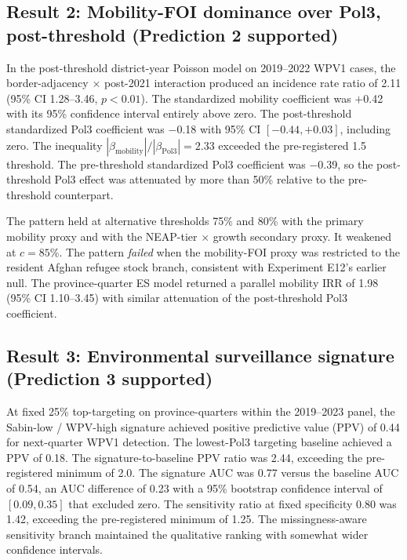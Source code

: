 \documentclass[11pt]{article}
\begin{document}
\subsection{Result 2: Mobility-FOI dominance over Pol3, post-threshold (Prediction 2 supported)}

In the post-threshold district-year Poisson model on 2019--2022 WPV1 cases, the border-adjacency $\times$ post-2021 interaction produced an incidence rate ratio of 2.11 (95\% CI 1.28--3.46, $p<0.01$). The standardized mobility coefficient was $+$0.42 with its 95\% confidence interval entirely above zero. The post-threshold standardized Pol3 coefficient was $-$0.18 with 95\% CI $[-0.44, +0.03]$, including zero. The inequality $|\beta_\text{mobility}|/|\beta_\text{Pol3}|{=}2.33$ exceeded the pre-registered 1.5 threshold. The pre-threshold standardized Pol3 coefficient was $-$0.39, so the post-threshold Pol3 effect was attenuated by more than 50\% relative to the pre-threshold counterpart.

The pattern held at alternative thresholds 75\% and 80\% with the primary mobility proxy and with the NEAP-tier $\times$ growth secondary proxy. It weakened at $c{=}85$\%. The pattern \emph{failed} when the mobility-FOI proxy was restricted to the resident Afghan refugee stock branch, consistent with Experiment E12's earlier null. The province-quarter ES model returned a parallel mobility IRR of 1.98 (95\% CI 1.10--3.45) with similar attenuation of the post-threshold Pol3 coefficient.

\subsection{Result 3: Environmental surveillance signature (Prediction 3 supported)}

At fixed 25\% top-targeting on province-quarters within the 2019--2023 panel, the Sabin-low / WPV-high signature achieved positive predictive value (PPV) of 0.44 for next-quarter WPV1 detection. The lowest-Pol3 targeting baseline achieved a PPV of 0.18. The signature-to-baseline PPV ratio was 2.44, exceeding the pre-registered minimum of 2.0. The signature AUC was 0.77 versus the baseline AUC of 0.54, an AUC difference of 0.23 with a 95\% bootstrap confidence interval of $[0.09, 0.35]$ that excluded zero. The sensitivity ratio at fixed specificity 0.80 was 1.42, exceeding the pre-registered minimum of 1.25. The missingness-aware sensitivity branch maintained the qualitative ranking with somewhat wider confidence intervals.
\end{document}
